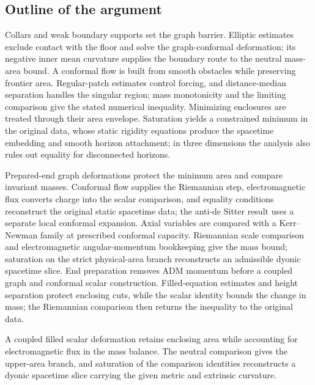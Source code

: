\documentclass[11pt]{article}
\begin{document}
\subsection{Outline of the argument}
Collars and weak boundary supports set the graph barrier. Elliptic estimates exclude contact with the floor and solve the graph-conformal deformation; its negative inner mean curvature supplies the boundary route to the neutral mass-area bound. A conformal flow is built from smooth obstacles while preserving frontier area. Regular-patch estimates control forcing, and distance-median separation handles the singular region; mass monotonicity and the limiting comparison give the stated numerical inequality. Minimizing enclosures are treated through their area envelope. Saturation yields a constrained minimum in the original data, whose static rigidity equations produce the spacetime embedding and smooth horizon attachment; in three dimensions the analysis also rules out equality for disconnected horizons.

Prepared-end graph deformations protect the minimum area and compare invariant masses. Conformal flow supplies the Riemannian step, electromagnetic flux converts charge into the scalar comparison, and equality conditions reconstruct the original static spacetime data; the anti-de Sitter result uses a separate local conformal expansion. Axial variables are compared with a Kerr--Newman family at prescribed conformal capacity. Riemannian scale comparison and electromagnetic angular-momentum bookkeeping give the mass bound; saturation on the strict physical-area branch reconstructs an admissible dyonic spacetime slice. End preparation removes ADM momentum before a coupled graph and conformal scalar construction. Filled-equation estimates and height separation protect enclosing cuts, while the scalar identity bounds the change in mass; the Riemannian comparison then returns the inequality to the original data.

A coupled filled scalar deformation retains enclosing area while accounting for electromagnetic flux in the mass balance. The neutral comparison gives the upper-area branch, and saturation of the comparison identities reconstructs a dyonic spacetime slice carrying the given metric and extrinsic curvature.
\end{document}
